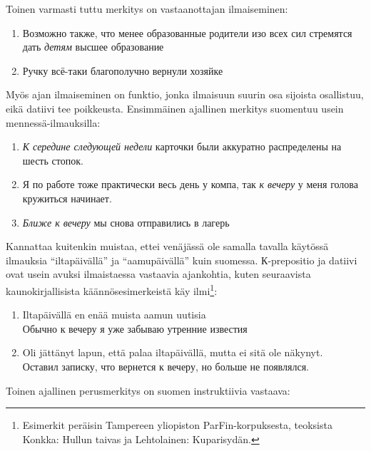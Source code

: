 \documentclass[]{scrreprt}
\providecommand{\tightlist}{%
  \setlength{\itemsep}{0pt}\setlength{\parskip}{0pt}}
\begin{document}
Toinen varmasti tuttu merkitys on vastaanottajan ilmaiseminen:

\begin{enumerate}
\def\labelenumi{(\arabic{enumi})}
\setcounter{enumi}{77}
\tightlist
\item
  Возможно также, что менее образованные родители изо всех сил стремятся
  дать \emph{детям} высшее образование
\item
  Ручку всё-таки благополучно вернули хозяйке
\end{enumerate}

Myös ajan ilmaiseminen on funktio, jonka ilmaisuun suurin osa sijoista
osallistuu, eikä datiivi tee poikkeusta. Ensimmäinen ajallinen merkitys
suomentuu usein mennessä-ilmauksilla:

\begin{enumerate}
\def\labelenumi{(\arabic{enumi})}
\setcounter{enumi}{79}
\tightlist
\item
  \emph{К середине следующей недели} карточки были аккуратно
  распределены на шесть стопок.
\item
  Я по работе тоже практически весь день у компа, так \emph{к вечеру} у
  меня голова кружиться начинает.
\item
  \emph{Ближе к вечеру} мы снова отправились в лагерь
\end{enumerate}

Kannattaa kuitenkin muistaa, ettei venäjässä ole samalla tavalla
käytössä ilmauksia ``iltapäivällä'' ja ``aamupäivällä'' kuin suomessa.
К-prepositio ja datiivi ovat usein avuksi ilmaistaessa vastaavia
ajankohtia, kuten seuraavista kaunokirjallisista käännösesimerkeistä käy
ilmi\footnote{Esimerkit peräisin Tampereen yliopiston
  ParFin-korpuksesta, teoksista Konkka: Hullun taivas ja Lehtolainen:
  Kuparisydän.}:

\begin{enumerate}
\def\labelenumi{(\arabic{enumi})}
\setcounter{enumi}{82}
\tightlist
\item
  Iltapäivällä en enää muista aamun uutisia\\
   Обычно к вечеру я уже забываю утренние известия
\item
  Oli jättänyt lapun, että palaa iltapäivällä, mutta ei sitä ole
  näkynyt.\\
   Оставил записку, что вернется к вечеру, но больше не появлялся.
\end{enumerate}

Toinen ajallinen perusmerkitys on suomen instruktiivia vastaava:
\end{document}
